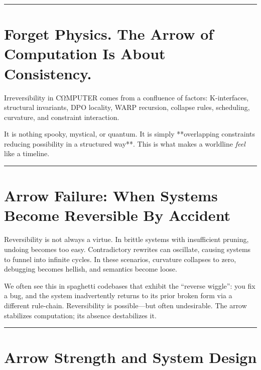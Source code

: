 \begin{center}\rule{0.5\linewidth}{0.5pt}\end{center}

\section{\texorpdfstring{\textbf{Forget Physics. The Arrow of Computation Is About Consistency.}}{14.7 --- Forget Physics. The Arrow of Computation Is About Consistency.}}

Irreversibility in CΩMPUTER comes from a confluence of factors: K-interfaces, structural invariants, DPO locality, WARP recursion, collapse rules, scheduling, curvature, and constraint interaction.

It is nothing spooky, mystical, or quantum. It is simply **overlapping constraints reducing possibility in a structured way**. This is what makes a worldline \emph{feel} like a timeline.

\begin{center}\rule{0.5\linewidth}{0.5pt}\end{center}

\section{\texorpdfstring{\textbf{Arrow Failure: When Systems Become Reversible By Accident}}{14.8 --- Arrow Failure: When Systems Become Reversible By Accident}}

Reversibility is not always a virtue. In brittle systems with insufficient pruning, undoing becomes too easy. Contradictory rewrites can oscillate, causing systems to funnel into infinite cycles. In these scenarios, curvature collapses to zero, debugging becomes hellish, and semantics become loose.

We often see this in spaghetti codebases that exhibit the ``reverse wiggle'': you fix a bug, and the system inadvertently returns to its prior broken form via a different rule-chain. Reversibility is possible—but often undesirable. The arrow stabilizes computation; its absence destabilizes it.

\begin{center}\rule{0.5\linewidth}{0.5pt}\end{center}

\section{\texorpdfstring{\textbf{Arrow Strength and System Design}}{14.9 --- Arrow Strength and System Design}}

